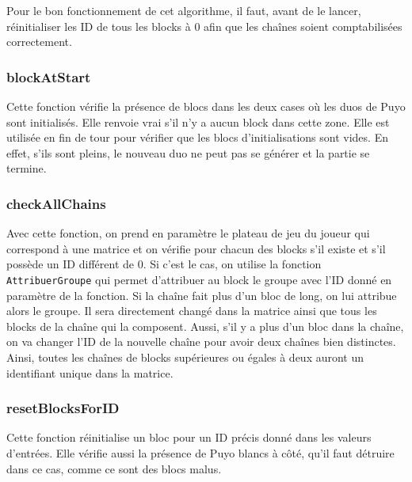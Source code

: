 \documentclass[11pt, final]{report}
\renewcommand{\tt}[1]{\texttt{#1}}
\begin{document}
Pour le bon fonctionnement de cet algorithme, il faut, avant de le lancer, réinitialiser les ID de tous les blocks à 0 afin que les chaînes soient comptabilisées correctement.
\\

\subsubsection{blockAtStart}

Cette fonction vérifie la présence de blocs dans les deux cases où les duos de Puyo sont initialisés. Elle renvoie vrai s'il n'y a aucun block dans cette zone. Elle est utilisée en fin de tour pour vérifier que les blocs d'initialisations sont vides. En effet, s'ils sont pleins, le nouveau duo ne peut pas se générer et la partie se termine.
\\

\subsubsection{checkAllChains}


Avec cette fonction, on prend en paramètre le plateau de jeu du joueur qui correspond à une matrice et on vérifie pour chacun des blocks s'il existe et s'il possède un ID différent de 0. Si c'est le cas, on utilise la fonction \tt{AttribuerGroupe} qui permet d'attribuer au block le groupe avec l'ID donné en paramètre de la fonction. Si la chaîne fait plus d'un bloc de long, on lui attribue alors le groupe. Il sera directement changé dans la matrice ainsi que tous les blocks de la chaîne qui la composent. Aussi, s'il y a plus d'un bloc dans la chaîne, on va changer l'ID de la nouvelle chaîne pour avoir deux chaînes bien distinctes. Ainsi, toutes les chaînes de blocks supérieures ou égales à deux auront un identifiant unique dans la matrice.
\\

\subsubsection{resetBlocksForID}

Cette fonction réinitialise un bloc pour un ID précis donné dans les valeurs d’entrées. Elle vérifie aussi la présence de Puyo blancs à côté, qu'il faut détruire dans ce cas, comme ce sont des blocs malus.
\\
\end{document}
